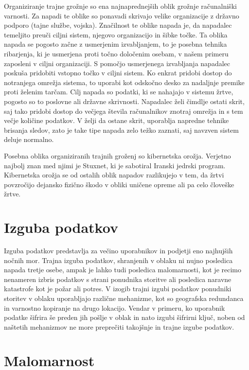 \documentclass[12pt,a4paper,openany,tikz]{book}
\theoremstyle{plain}
\theoremstyle{definition}
\begin{document}
Organiziranje trajne grožnje so ena najnaprednejših oblik grožnje računalniški varnosti. Za napadi te oblike so ponavadi skrivajo velike organizacije z državno podporo (tajne službe, vojska). Značilnost te oblike napada je, da napadalec temeljito preuči ciljni sistem, njegovo organizacijo in šibke točke. Ta oblika napada se pogosto začne z usmerjenim izvabljanjem, to je posebna tehnika ribarjenja, ki je usmerjena proti točno določenim osebam, v našem primeru zaposleni v ciljni organizaciji. S pomočjo usmerjenega izvabljanja napadalec poskuša pridobiti vstopno točko v ciljni sistem. Ko enkrat pridobi dostop do notranjega omrežja sistema, to uporabi kot odskočno desko za nadaljnje premike proti želenim tarčam. Cilj napada so podatki, ki se nahajajo v sistemu žrtve, pogosto so to poslovne ali državne skrivnosti. Napadalec želi čimdlje ostati skrit, saj tako pridobi dostop do večjega števila računalnikov znotraj omrežja in s tem večje količine podatkov. V želji da ostane skrit, uporablja napredne tehnike brisanja sledov, zato je take tipe napada zelo težko zaznati, saj navzven sistem deluje normalno.

Posebna oblika organiziranih trajnih groženj so kibernetska orožja. Verjetno najbolj znan med njimi je Stuxnet, ki je sabotiral Iranski jedrski program. Kibernetska orožja se od ostalih oblik napadov razlikujejo v tem, da žrtvi povzročijo dejansko fizično škodo v obliki uničene opreme ali pa celo človeške žrtve.

\section{Izguba podatkov}
\label{sub:Izguba podatkov}

Izguba podatkov predstavlja za večino uporabnikov in podjetji eno najhujših nočnih mor. Trajna izguba podatkov, shranjenih v oblaku ni nujno posledica napada tretje osebe, ampak je lahko tudi posledica malomarnosti, kot je recimo nenameren izbris podatkov s strani ponudnika storitve ali posledica naravne katastrofe kot je požar ali potres. V izogib trajni izgubi podatkov ponudniki storitev v oblaku uporabljajo različne mehanizme, kot so geografska redundanca in varnostno kopiranje na drugo lokacijo. Vendar v primeru, ko uporabnik podatke šifrira še preden jih pošlje v oblak in nato izgubi šifrirni ključ, noben od naštetih mehanizmov ne more preprečiti takojšnje in trajne izgube podatkov.

\section{Malomarnost}
\label{sub:Malomarnost}
\end{document}
